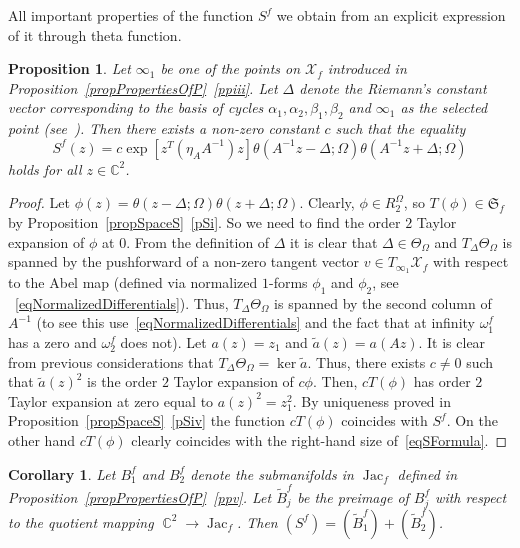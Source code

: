 \documentclass{amsart}
\numberwithin{equation}{section}
\newtheorem{proposition}[theorem]{Proposition}
\newtheorem{corollary}[theorem]{Corollary}
\theoremstyle{definition}
\theoremstyle{remark}
\DeclareMathOperator{\Jac}{Jac}
\DeclareMathOperator{\CC}{\mathbb C}
\begin{document}
	All important properties of the function $S^f$ we obtain from an explicit expression of it through theta function.
	
	\begin{proposition}\label{propFormulaS}
		Let $\infty_1$ be one of the points on $\mathcal X_f$ introduced in Proposition~\ref{propPropertiesOfP}~\ref{ppiii}. Let $\Delta$ denote the Riemann's constant vector corresponding to the basis of cycles $\alpha_1, \alpha_2, \beta_1,\beta_2$ and $\infty_1$ as the selected point (see~\cite[Theorem~II.3.1]{mumfordI}).
		Then there exists a non-zero constant $c$ such that the equality
		\begin{equation}\label{eqSFormula}
			S^f(z) = c\exp\left[z^T (\eta_AA^{-1})z\right]\theta(A^{-1}z - \Delta; \Omega)\theta(A^{-1}z + \Delta; \Omega)
		\end{equation}
		holds for all $z \in \mathbb C^2$.
	\end{proposition}
	\begin{proof}
		Let $\phi(z) = \theta(z - \Delta;\Omega)\theta(z + \Delta;\Omega)$. Clearly, $\phi \in R_2^\Omega$, so $T(\phi) \in \mathfrak S_f$ by Proposition~\ref{propSpaceS}~\ref{pSi}. So we need to find the order $2$ Taylor expansion of $\phi$ at $0$. From the definition of $\Delta$ it is clear that $\Delta \in \Theta_\Omega$ and $T_\Delta\Theta_\Omega$ is spanned by the pushforward of a non-zero tangent vector $v \in T_{\infty_1}\mathcal X_f$ with respect to the Abel map (defined via normalized $1$-forms $\phi_1$ and $\phi_2$, see ~\eqref{eqNormalizedDifferentials}). Thus, $T_\Delta\Theta_\Omega$ is spanned by the second column of $A^{-1}$ (to see this use~\eqref{eqNormalizedDifferentials} and the fact that at infinity $\omega_1^f$ has a zero and $\omega_2^f$ does not). Let $a(z) = z_1$ and $\tilde a(z) = a(Az)$. It is clear from previous considerations that $T_\Delta\Theta_\Omega = \ker \tilde a$. Thus, there exists $c \ne 0$ such that $\tilde a(z)^2$ is the order $2$ Taylor expansion of $c\phi$. Then, $cT(\phi)$ has order $2$ Taylor expansion at zero equal to $a(z)^2 = z_1^2$. By uniqueness proved in Proposition~\ref{propSpaceS}~\ref{pSiv} the function $cT(\phi)$ coincides with $S^f$. On the other hand $cT(\phi)$ clearly coincides with the right-hand size of~\eqref{eqSFormula}.
	\end{proof}
	\begin{corollary}\label{corDivisorS}
		Let $B^f_1$ and $B^f_2$ denote the submanifolds in $\Jac_f$ defined in Proposition~\ref{propPropertiesOfP}~\ref{ppv}. Let $\tilde{B}^f_j$ be the preimage of $B^f_j$ with respect to the quotient mapping $\CC^2 \to \Jac_f$. Then $(S^f) = (\tilde{B}_1^f) + (\tilde{B}_2^f)$.
	\end{corollary}
\end{document}
